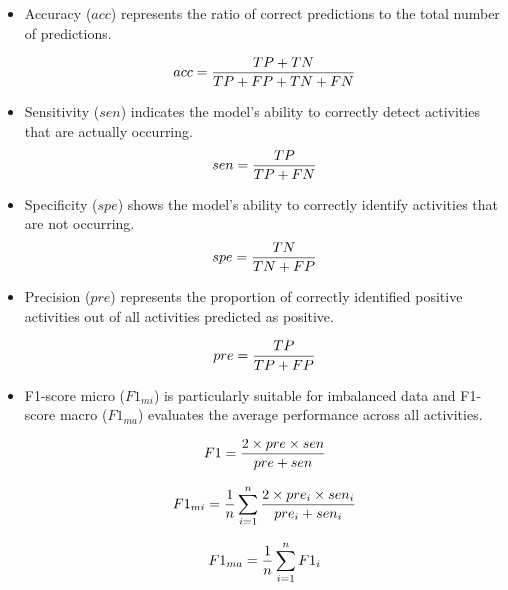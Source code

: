 \documentclass[journal,twoside,web]{ieeecolor}
\begin{document}
\begin{itemize}
    \item Accuracy ($acc$) represents the ratio of correct predictions to the total number of predictions.
        
        \begin{equation}
        \footnotesize
        \label{eqACC}
        acc =\frac{TP+TN}{TP+FP+TN+FN}
        \end{equation} 
    \item Sensitivity ($sen$) indicates the model's ability to correctly detect activities that are actually occurring.
        \begin{equation}\label{eqSEN}
        \footnotesize
        sen =\frac{TP}{TP+FN}
        \end{equation} 
    \item Specificity ($spe$) shows the model’s ability to correctly identify activities that are not occurring.
        \begin{equation}\label{eqSPE}
        \footnotesize
        spe =\frac{TN}{TN+FP}
        \end{equation} 
    \item Precision ($pre$) represents the proportion of correctly identified positive activities out of all activities predicted as positive.

        \begin{equation}\label{eqPRE}
        \footnotesize
        pre =\frac{TP}{TP+FP}
        \end{equation}  
\end{itemize}
    
\begin{itemize}
    \item F1-score micro ($F1_{mi}$) is particularly suitable for imbalanced data and F1-score macro ($F1_{ma}$) evaluates the average performance across all activities.

\begin{equation} \label{eqF1score}
\footnotesize
F1  = \frac{2 \times pre\times sen}{pre + sen}
\end{equation}

\begin{equation} \label{eqF1macro}
\footnotesize
F1_{mi}  =  \frac{1}{n} \sum_{i=1}^n \frac{2 \times pre_i \times sen_i}{pre_i + sen_i}
\end{equation}

\begin{equation} \label{eqF1micro}
\footnotesize
F1_{ma}  = \frac{1}{n}\sum_{i=1}^n F1_i
\end{equation}

\end{itemize}
\end{document}
